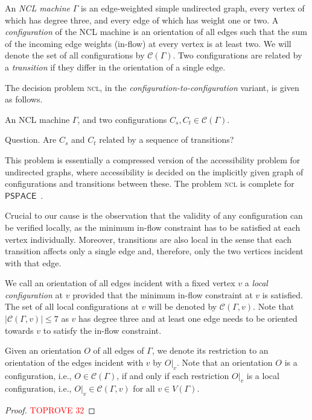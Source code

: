\documentclass[anonymous,letter,UKenglish,cleveref,autoref,thm-restate]{lipics-v2021}
\makeatletter
\renewcommand{\leq}{\leqslant}
\newcommand{\PSPACE}{\ensuremath{\mathsf{PSPACE}}\xspace}
\newcommand{\cC}{\mathcal{C}}
\theoremstyle{plain}
\theoremstyle{plain}
\providecommand\iitem{}
\providecommand\qitem{}
\newcommand\decproblem@iitem@label{\rlap{Input.}\phantom{Question.}}
\newcommand\decproblem@qitem@label{Question.}
\newenvironment{decproblem}{\begin{description}\begin{samepage}\renewcommand{\iitem}{\item[\decproblem@iitem@label]}\renewcommand{\qitem}{\item[\decproblem@qitem@label]}}{\end{samepage}\end{description}}
\newcommand{\prob}[1]{\textup{\textsc{#1}}\xspace}
\newcommand{\dNCL}{\prob{ncl}}
\makeatother
\begin{document}
An \emph{NCL machine} $\Gamma$ is an edge-weighted simple undirected graph, every vertex of which has degree three, and every edge of which has weight one or two.
A \emph{configuration} of the NCL machine is an orientation of all edges such that the sum of the incoming edge weights (in-flow) at every vertex is at least two.
We will denote the set of all configurations by $\cC(\Gamma)$.
Two configurations are related by a \emph{transition} if they differ in the orientation of a single edge.

The decision problem \dNCL, in the \emph{configuration-to-configuration} variant, is given as follows.

\begin{decproblem}
  \iitem An NCL machine $\Gamma$, and two configurations $C_s, C_t \in \cC(\Gamma)$.
  \qitem Are $C_s$ and $C_t$ related by a sequence of transitions?
\end{decproblem}

This problem is essentially a compressed version of the accessibility problem for undirected graphs, where accessibility is decided on the implicitly given graph of configurations and transitions between these.
The problem \dNCL{} is complete for \PSPACE{}~\cite[Theorem 5]{HearnD05}.

Crucial to our cause is the observation that the validity of any configuration can be verified locally, as the minimum in-flow constraint has to be satisfied at each vertex individually. 
Moreover, transitions are also local in the sense that each transition affects only a single edge and, therefore, only the two vertices incident with that edge.

We call an orientation of all edges incident with a fixed vertex $v$ a \emph{local configuration} at $v$ provided that the minimum in-flow constraint at $v$ is satisfied.
The set of all local configurations at $v$ will be denoted by $\cC(\Gamma, v)$.
Note that $\lvert \cC(\Gamma, v) \rvert \leq 7$ as $v$ has degree three and at least one edge needs to be oriented towards $v$ to satisfy the in-flow constraint.

Given an orientation $O$ of all edges of $\Gamma$, we denote its restriction to an orientation of the edges incident with $v$ by $O\vert_v$.
Note that an orientation $O$ is a configuration, i.e., $O \in \cC(\Gamma)$, if and only if each restriction $O\vert_v$ is a local configuration, i.e., $O\vert_v \in \cC(\Gamma, v)$ for all $v \in V(\Gamma)$.


\begin{proof}\textcolor{red}{TOPROVE 32}\end{proof}
\end{document}
